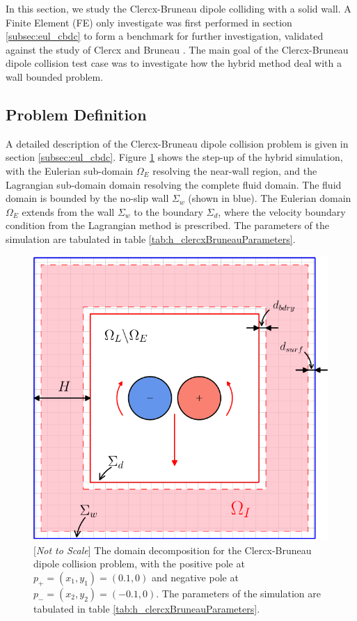 In this section, we study the Clercx-Bruneau dipole colliding with a solid wall. A Finite Element (FE) only investigate was first performed in section \ref{subsec:eul_cbdc} to form a benchmark for further investigation, validated against the study of Clercx and Bruneau \cite{Clercx2006a}. The main goal of the Clercx-Bruneau dipole collision test case was to investigate how the hybrid method deal with a wall bounded problem. 

\subsection{Problem Definition}

A detailed description of the Clercx-Bruneau dipole collision problem is given in section \ref{subsec:eul_cbdc}. Figure \ref{fig:hcbdc_dd} shows the step-up of the hybrid simulation, with the Eulerian sub-domain $\Omega_E$ resolving the near-wall region, and the Lagrangian sub-domain domain resolving the complete fluid domain. The fluid domain is bounded by the no-slip wall $\Sigma_{w}$ (shown in blue). The Eulerian domain $\Omega_E$ extends from the wall $\Sigma_{w}$ to the boundary $\Sigma_{d}$, where the velocity boundary condition from the Lagrangian method is prescribed. The parameters of the simulation are tabulated in table \ref{tab:h_clercxBruneauParameters}.

	\begin{figure}[!p]
	\centering
	\includegraphics[width=0.6\linewidth]{./figures/validation/cbColl/hcbdc_dd-crop.pdf}
	\caption{[\textit{Not to Scale}] The domain decomposition for the Clercx-Bruneau dipole collision problem, with the positive pole at $p_{+}=(x_1,y_1) = (0.1,0)$ and negative pole at $p_{-}=(x_2,y_2)=(-0.1,0)$. The parameters of the simulation are tabulated in table \ref{tab:h_clercxBruneauParameters}.}
	\label{fig:hcbdc_dd}
	\end{figure}

